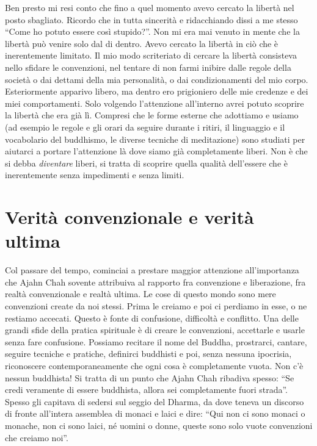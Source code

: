 Ben presto mi resi conto che fino a quel momento avevo cercato la libertà nel posto sbagliato. Ricordo che in tutta sincerità e ridacchiando dissi a me stesso ``Come ho potuto essere così stupido?''. Non mi era mai venuto in mente che la libertà può venire solo dal di dentro. Avevo cercato la libertà in ciò che è inerentemente limitato. Il mio modo scriteriato di cercare la libertà consisteva nello sfidare le convenzioni, nel tentare di non farmi inibire dalle regole della società o dai dettami della mia personalità, o dai condizionamenti del mio corpo. Esteriormente apparivo libero, ma dentro ero prigioniero delle mie credenze e dei miei comportamenti. Solo volgendo l'attenzione all'interno avrei potuto scoprire la libertà che era già lì. Compresi che le forme esterne che adottiamo e usiamo (ad esempio le regole e gli orari da seguire durante i ritiri, il linguaggio e il vocabolario del buddhismo, le diverse tecniche di meditazione) sono studiati per aiutarci a portare l'attenzione là dove siamo già completamente liberi. Non è che si debba \textit{diventare} liberi, si tratta di scoprire quella qualità dell'essere che è inerentemente senza impedimenti e senza limiti.

\section*{Verit\`a convenzionale e verit\`a ultima}

Col passare del tempo, cominciai a prestare maggior attenzione all'importanza che Ajahn Chah sovente attribuiva al rapporto fra convenzione e liberazione, fra realtà convenzionale e realtà ultima. Le cose di questo mondo sono mere convenzioni create da noi stessi. Prima le creiamo e poi ci perdiamo in esse, o ne restiamo accecati. Questo è fonte di confusione, difficoltà e conflitto. Una delle grandi sfide della pratica spirituale è di creare le convenzioni, accettarle e usarle senza fare confusione. Possiamo recitare il nome del Buddha, prostrarci, cantare, seguire tecniche e pratiche, definirci buddhisti e poi, senza nessuna ipocrisia, riconoscere contemporaneamente che ogni cosa è completamente vuota. Non c'è nessun buddhista! Si tratta di un punto che Ajahn Chah ribadiva spesso: ``Se credi veramente di essere buddhista, allora sei completamente fuori strada''. Spesso gli capitava di sedersi sul seggio del Dharma, da dove teneva un discorso di fronte all'intera assemblea di monaci e laici e dire: ``Qui non ci sono monaci o monache, non ci sono laici, né uomini o donne, queste sono solo vuote convenzioni che creiamo noi''.


